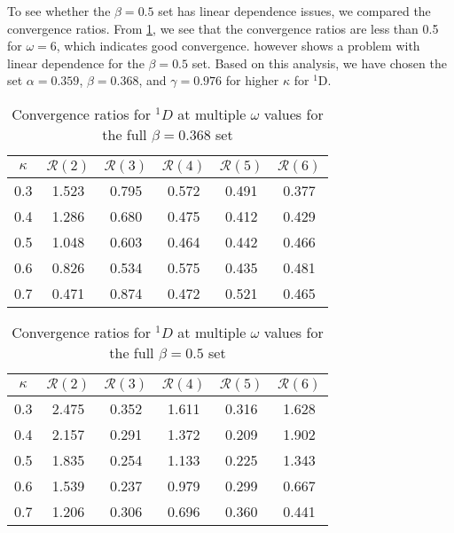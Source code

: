 \documentclass[Dissertation.tex]{subfiles}
\begin{document}
To see whether the $\beta = 0.5$ set has linear dependence issues, we compared
the convergence ratios. From \cref{tab:D1Beta368VarConv}, we see that the
convergence ratios are less than 0.5 for $\omega = 6$, which indicates good
convergence.  however shows a problem with linear
dependence for the $\beta = 0.5$ set. Based on this analysis, we have chosen
the set $\alpha = 0.359$, $\beta = 0.368$, and $\gamma = 0.976$ for higher
$\kappa$ for $^1$D.

\begin{table}
\centering
\begin{tabular}{cccccc}
\toprule
$\kappa$ & $\mathcal{R}(2)$ & $\mathcal{R}(3)$ & $\mathcal{R}(4)$ & $\mathcal{R}(5)$ & $\mathcal{R}(6)$ \\
\midrule
0.3 & 1.523 & 0.795 & 0.572 & 0.491 & 0.377 \\
0.4 & 1.286 & 0.680 & 0.475 & 0.412 & 0.429 \\
0.5 & 1.048 & 0.603 & 0.464 & 0.442 & 0.466 \\
0.6 & 0.826 & 0.534 & 0.575 & 0.435 & 0.481 \\
0.7 & 0.471 & 0.874 & 0.472 & 0.521 & 0.465 \\
\bottomrule
\end{tabular}
\caption{Convergence ratios for $^1D$ at multiple $\omega$ values for the full $\beta = 0.368$ set}
\label{tab:D1Beta368VarConv}
\end{table}


\begin{table}
\centering
\begin{tabular}{cccccc}
\toprule
$\kappa$ & $\mathcal{R}(2)$ & $\mathcal{R}(3)$ & $\mathcal{R}(4)$ & $\mathcal{R}(5)$ & $\mathcal{R}(6)$ \\
\midrule
0.3 & 2.475 & 0.352 & 1.611 & 0.316 & 1.628 \\
0.4 & 2.157 & 0.291 & 1.372 & 0.209 & 1.902 \\
0.5 & 1.835 & 0.254 & 1.133 & 0.225 & 1.343 \\
0.6 & 1.539 & 0.237 & 0.979 & 0.299 & 0.667 \\
0.7 & 1.206 & 0.306 & 0.696 & 0.360 & 0.441 \\
\bottomrule
\end{tabular}
\caption{Convergence ratios for $^1D$ at multiple $\omega$ values for the full $\beta = 0.5$ set}
\label{tab:D1Beta5VarConv}
\end{table}
\end{document}
